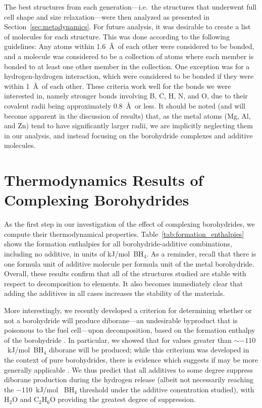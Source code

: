 \documentclass[twocolumn, prb, showpacs]{revtex4-1}
\begin{document}
The best structures from each generation---i.e.\ the structures that underwent
full cell shape and size relaxation---were then analyzed as presented in Section~\ref{sec:metadynamics}. For future
analysis, it was desirable to create a list of molecules for each structure. This was done according to the following guidelines:
Any atoms within 1.6~\AA\ of each other
were considered to be bonded, and a molecule was considered to be a collection
of atoms where each member is bonded to at least one other member in the
collection. One exception was for a hydrogen-hydrogen interaction, which were
considered to be bonded if they were within 1~\AA\ of each other. These criteria work well 
for the bonds we were interested in, namely stronger bonds involving B, C, H, N, and O, due to their
covalent radii being approximately 0.8~\AA\ or less. It should be noted (and will become apparent in the discussion of results) that, as the metal
atoms (Mg, Al, and Zn) tend to have significantly larger radii, we are implicitly neglecting them in our analysis, and instead
focusing on the borohydride complexes and additive molecules.








\section{Thermodynamics Results of Complexing Borohydrides}

As the first step in our investigation of the effect of complexing
borohydrides, we compute their thermodynamical properties. 
Table~\ref{tab:formation_enthalpies} shows the formation enthalpies for all borohydride-additive
combinations, including no additive, in units of kJ/mol~BH$_4$. As a reminder, recall that there is one formula unit
of additive molecule per formula unit of the metal borohydride. 
Overall,
these results confirm that all
of the structures studied are stable with respect to decomposition to elements.
It also becomes immediately clear that adding the additives in all cases
increases the stability of the materials.

More interestingly, we recently developed a criterion for determining
whether or not a borohydride will produce diborane---an undesirable byproduct that is poisonous to the fuel cell---upon decomposition, based on the formation enthalpy of
the borohydride \cite{Harrison_2016:suppressing_diborane}. In particular, we showed that
for values greater than $\sim-110$~kJ/mol~BH$_4$ diborane will be produced; while
this criterium was developed in the context of pure borohydrides, there is
evidence which suggests if may be more generally applicable \cite{Harrison_2016:suppressing_diborane,Gu_2012:structure_decomposition}. 
We thus predict that all additives
to some degree suppress diborane production during the hydrogen release (albeit not necessarily reaching the $-$110~kJ/mol~	BH$_4$ threshold under the additive conentration studied), with H$_2$O and
C$_2$H$_6$O providing the greatest degree of suppression.
\end{document}
